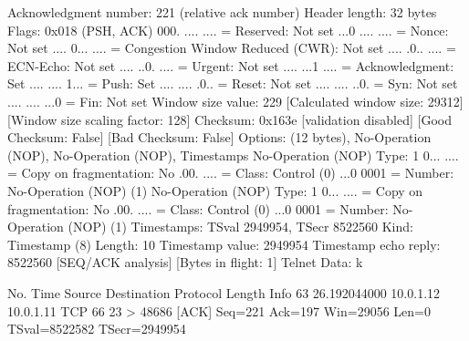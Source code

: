     Acknowledgment number: 221    (relative ack number)
    Header length: 32 bytes
    Flags: 0x018 (PSH, ACK)
        000. .... .... = Reserved: Not set
        ...0 .... .... = Nonce: Not set
        .... 0... .... = Congestion Window Reduced (CWR): Not set
        .... .0.. .... = ECN-Echo: Not set
        .... ..0. .... = Urgent: Not set
        .... ...1 .... = Acknowledgment: Set
        .... .... 1... = Push: Set
        .... .... .0.. = Reset: Not set
        .... .... ..0. = Syn: Not set
        .... .... ...0 = Fin: Not set
    Window size value: 229
    [Calculated window size: 29312]
    [Window size scaling factor: 128]
    Checksum: 0x163e [validation disabled]
        [Good Checksum: False]
        [Bad Checksum: False]
    Options: (12 bytes), No-Operation (NOP), No-Operation (NOP), Timestamps
        No-Operation (NOP)
            Type: 1
                0... .... = Copy on fragmentation: No
                .00. .... = Class: Control (0)
                ...0 0001 = Number: No-Operation (NOP) (1)
        No-Operation (NOP)
            Type: 1
                0... .... = Copy on fragmentation: No
                .00. .... = Class: Control (0)
                ...0 0001 = Number: No-Operation (NOP) (1)
        Timestamps: TSval 2949954, TSecr 8522560
            Kind: Timestamp (8)
            Length: 10
            Timestamp value: 2949954
            Timestamp echo reply: 8522560
    [SEQ/ACK analysis]
        [Bytes in flight: 1]
Telnet
    Data: k

No.     Time           Source                Destination           Protocol Length Info
     63 26.192044000   10.0.1.12             10.0.1.11             TCP      66     23 > 48686 [ACK] Seq=221 Ack=197 Win=29056 Len=0 TSval=8522582 TSecr=2949954

